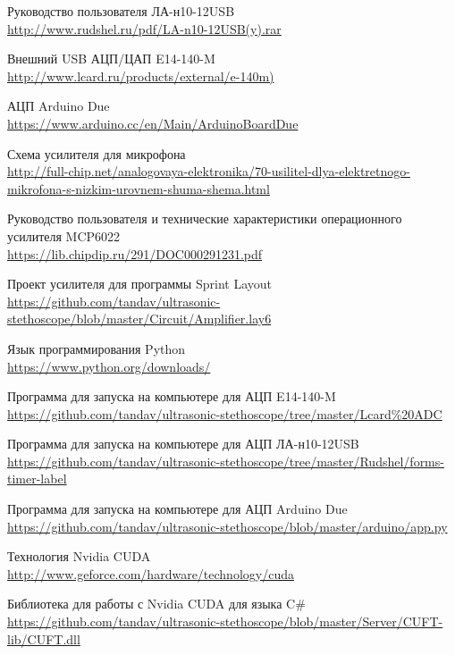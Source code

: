 \documentclass[../paper.tex]{subfiles}
\begin{document}
\begin{thebibliography}{}
Руководство пользователя ЛА-н10-12USB\\
\url{http://www.rudshel.ru/pdf/LA-n10-12USB(y).rar}

Внешний USB АЦП/ЦАП E14-140-M\\
\url{http://www.lcard.ru/products/external/e-140m)}

АЦП Arduino Due\\
\url{https://www.arduino.cc/en/Main/ArduinoBoardDue}

Схема усилителя для микрофона\\
\url{http://full-chip.net/analogovaya-elektronika/70-usilitel-dlya-elektretnogo-mikrofona-s-nizkim-urovnem-shuma-shema.html}

Руководство пользователя и технические характеристики операционного усилителя MCP6022\\
\url{https://lib.chipdip.ru/291/DOC000291231.pdf}

Проект усилителя для программы Sprint Layout\\
\url{https://github.com/tandav/ultrasonic-stethoscope/blob/master/Circuit/Amplifier.lay6}

Язык программирования Python\\
\url{https://www.python.org/downloads/}

Программа для запуска на компьютере для АЦП E14-140-M\\
\url{https://github.com/tandav/ultrasonic-stethoscope/tree/master/Lcard%20ADC}

Программа для запуска на компьютере для АЦП ЛА-н10-12USB\\
\url{https://github.com/tandav/ultrasonic-stethoscope/tree/master/Rudshel/forms-timer-label}

Программа для запуска на компьютере для АЦП Arduino Due\\
\url{https://github.com/tandav/ultrasonic-stethoscope/blob/master/arduino/app.py}

Технология Nvidia CUDA\\
\url{http://www.geforce.com/hardware/technology/cuda}

Библиотека для работы с Nvidia CUDA для языка C\#\\
\url{https://github.com/tandav/ultrasonic-stethoscope/blob/master/Server/CUFT-lib/CUFT.dll}


\end{thebibliography}
\end{document}
